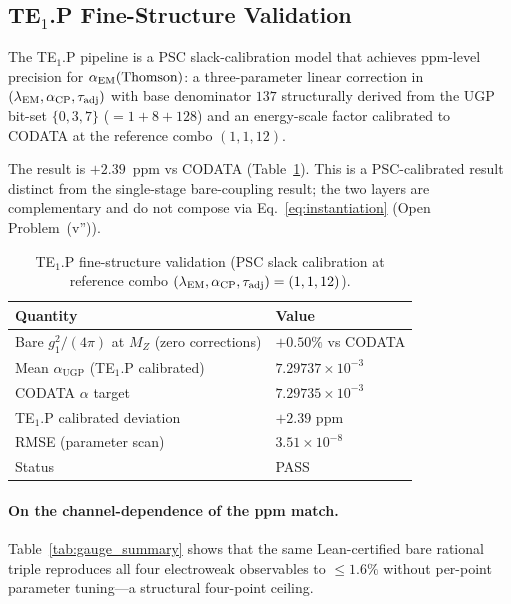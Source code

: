 \documentclass[11pt]{article}
\theoremstyle{remark}
\newcommand{\UGP}{\text{UGP}}
\begin{document}
\subsection{TE\texorpdfstring{$_1$}{1}.P Fine-Structure Validation}
\label{subsec:gauge_validation}

The TE$_1$.P pipeline is a PSC slack-calibration model that achieves ppm-level precision for $\alpha_{\rm EM}(\text{Thomson})$: a three-parameter linear correction in $(\lambda_{\rm EM}, \alpha_{\rm CP}, \tau_{\rm adj})$ with base denominator $137$ structurally derived from the UGP bit-set $\{0,3,7\}$ ($=1+8+128$) and an energy-scale factor calibrated to CODATA at the reference combo $(1,1,12)$.

The result is $+2.39$~ppm vs CODATA (Table~\ref{tab:te1p}).
This is a PSC-calibrated result distinct from the single-stage bare-coupling result; the two layers are complementary and do not compose via Eq.~\eqref{eq:instantiation} (Open Problem~(v'')).

\begin{table}[H]
\centering
\caption{TE$_1$.P fine-structure validation (PSC slack calibration at reference combo $(\lambda_{\rm EM},\alpha_{\rm CP},\tau_{\rm adj})=(1,1,12)$).}
\label{tab:te1p}
\renewcommand{\arraystretch}{1.15}
\small
\begin{tabularx}{0.92\linewidth}{@{}lX@{}}
\toprule
\textbf{Quantity} & \textbf{Value} \\
\midrule
Bare $g_1^2/(4\pi)$ at $M_Z$ (zero corrections) & $+0.50\%$ vs CODATA \\
Mean $\alpha_{\UGP}$ (TE$_1$.P calibrated) & $7.29737 \times 10^{-3}$ \\
CODATA $\alpha$ target & $7.29735 \times 10^{-3}$ \\
TE$_1$.P calibrated deviation & $+2.39$ ppm \\
RMSE (parameter scan) & $3.51 \times 10^{-8}$ \\
Status & PASS \\
\bottomrule
\end{tabularx}
\end{table}

\paragraph{On the channel-dependence of the ppm match.}
Table~\ref{tab:gauge_summary} shows that the same Lean-certified bare rational triple reproduces all four electroweak observables to $\le 1.6\%$ without per-point parameter tuning---a structural four-point ceiling.
\end{document}
